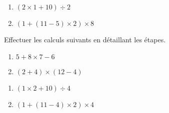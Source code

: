 \documentclass{/home/nyaucki/Documents/Prof/CoursMaths/mycls/DevoirMaison}
\begin{document}
\begin{multicols}{2}
	\begin{enumerate}[start=3,label=\alph*.]
		\item $(2 \times 1 +10 ) \div 2$  \vspace*{8em}
		\item $(1 + (11 -5)\times 2)\times 8$ \vspace*{8em}
	\end{enumerate}
\end{multicols}



\newpage





\renewcommand{\nom}{VEZ Dawson} 

\renewcommand{\prenom}{Dawson}



Effectuer les calculs suivants en détaillant les étapes.

\begin{multicols}{2}
	\begin{enumerate}[label=\alph*.]
		\item $5 + 8 \times 7 - 6$  \vspace*{7em}
		\item $(2 +4)\times (12 -4)$ \vspace*{7em}
	\end{enumerate}
\end{multicols}

\begin{multicols}{2}
	\begin{enumerate}[start=3,label=\alph*.]
		\item $(1 \times 2 +10 ) \div 4$  \vspace*{8em}
		\item $(1 + (11 -4)\times 2)\times 4$ \vspace*{8em}
	\end{enumerate}
\end{multicols}



\vfill
\end{document}
